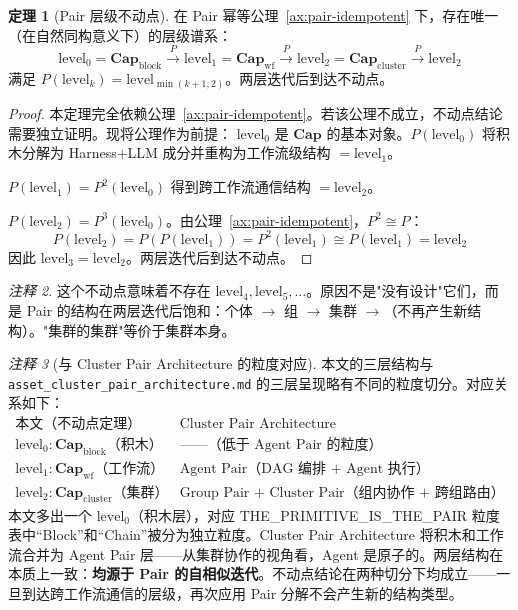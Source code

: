 \documentclass[11pt,a4paper]{article}
\theoremstyle{definition}
\newtheorem{theorem}{定理}[section]
\theoremstyle{definition}
\theoremstyle{remark}
\newtheorem{remark}[theorem]{注释}
\newcommand{\cat}[1]{\mathbf{#1}}
\newcommand{\catCap}{\cat{Cap}}
\newcommand{\pairMonad}{P}
\begin{document}
\begin{theorem}[Pair 层级不动点]
在 Pair 幂等公理~\ref{ax:pair-idempotent} 下，存在唯一（在自然同构意义下）的层级谱系：
\[
\mathrm{level}_0 = \catCap_{\mathrm{block}} \xrightarrow{\pairMonad} \mathrm{level}_1 = \catCap_{\mathrm{wf}} \xrightarrow{\pairMonad} \mathrm{level}_2 = \catCap_{\mathrm{cluster}} \xrightarrow{\pairMonad} \mathrm{level}_2
\]
满足 $\pairMonad(\mathrm{level}_k) = \mathrm{level}_{\min(k+1, 2)}$。两层迭代后到达不动点。
\label{thm:fixed-point}
\end{theorem}

\begin{proof}
本定理完全依赖公理~\ref{ax:pair-idempotent}。若该公理不成立，不动点结论需要独立证明。现将公理作为前提：
$\mathrm{level}_0$ 是 $\catCap$ 的基本对象。$\pairMonad(\mathrm{level}_0)$ 将积木分解为 Harness+LLM 成分并重构为工作流级结构 $= \mathrm{level}_1$。

$\pairMonad(\mathrm{level}_1) = \pairMonad^2(\mathrm{level}_0)$ 得到跨工作流通信结构 $= \mathrm{level}_2$。

$\pairMonad(\mathrm{level}_2) = \pairMonad^3(\mathrm{level}_0)$。由公理~\ref{ax:pair-idempotent}，$\pairMonad^2 \cong \pairMonad$：
\[
\pairMonad(\mathrm{level}_2) = \pairMonad(\pairMonad(\mathrm{level}_1)) = \pairMonad^2(\mathrm{level}_1) \cong \pairMonad(\mathrm{level}_1) = \mathrm{level}_2
\]
因此 $\mathrm{level}_3 = \mathrm{level}_2$。两层迭代后到达不动点。
\end{proof}

\begin{remark}
这个不动点意味着不存在 $\mathrm{level}_4, \mathrm{level}_5, \dots$。原因不是"没有设计"它们，而是 Pair 的结构在两层迭代后饱和：个体 $\to$ 组 $\to$ 集群 $\to$（不再产生新结构）。"集群的集群"等价于集群本身。
\end{remark}

\begin{remark}[与 Cluster Pair Architecture 的粒度对应]
本文的三层结构与 \texttt{asset\_cluster\_pair\_architecture.md} 的三层呈现略有不同的粒度切分。对应关系如下：
\[
\begin{array}{c|c}
\text{本文（不动点定理）} & \text{Cluster Pair Architecture} \\
\hline
\mathrm{level}_0: \catCap_{\mathrm{block}} \text{（积木）} & \text{——（低于 Agent Pair 的粒度）} \\
\mathrm{level}_1: \catCap_{\mathrm{wf}} \text{（工作流）} & \text{Agent Pair（DAG 编排 + Agent 执行）} \\
\mathrm{level}_2: \catCap_{\mathrm{cluster}} \text{（集群）} & \text{Group Pair + Cluster Pair（组内协作 + 跨组路由）}
\end{array}
\]
本文多出一个 $\mathrm{level}_0$（积木层），对应 THE\_PRIMITIVE\_IS\_THE\_PAIR 粒度表中``Block''和``Chain''被分为独立粒度。Cluster Pair Architecture 将积木和工作流合并为 Agent Pair 层——从集群协作的视角看，Agent 是原子的。两层结构在本质上一致：\textbf{均源于 Pair 的自相似迭代}。不动点结论在两种切分下均成立——一旦到达跨工作流通信的层级，再次应用 Pair 分解不会产生新的结构类型。
\end{remark}
\end{document}
